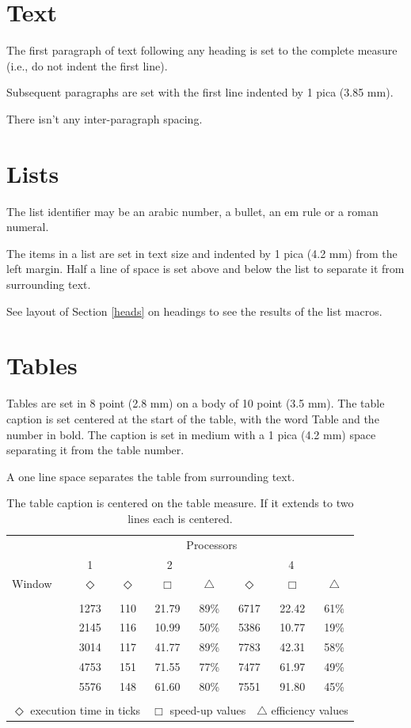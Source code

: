 \documentclass{ecai}
\begin{document}
\section{Text}
The first paragraph of text following any heading is set to the
complete measure (i.e., do not indent the first line).

Subsequent paragraphs are set with the first line indented
by 1 pica (3.85 mm).

There isn't any inter-paragraph spacing.

\section{Lists}
The list identifier may be an arabic number, a bullet, an em
rule or a roman numeral.

The items in a list are set in text size and indented by 1
pica (4.2 mm) from the left margin. Half a line of space is
set above and below the list to separate it from surrounding
text.

See layout of Section \ref{heads} on headings to see the results of the list macros.

\section{Tables}
Tables are set in 8 point (2.8 mm) on a body of 10 point (3.5 mm).
The table caption is set centered at the start of the table, with
the word Table and the number in bold. The caption is set in medium
with a 1 pica (4.2 mm) space separating it from the table number.

A one line space separates the table from surrounding text.

\begin{table}
\begin{center}
{\caption{The table caption is centered on the table measure. If it
extends to two lines each is centered.}\label{table1}}
\begin{tabular}{lccccccc}
\hline
\rule{0pt}{12pt}
&\multicolumn{7}{c}{Processors}\\
&1&\multicolumn{3}{c}{2}&\multicolumn{3}{c}{4}\\
\cline{2-8}
\rule{0pt}{12pt}
Window&$\Diamond$&$\Diamond$&$\Box$&$\bigtriangleup$&$\Diamond$&$\Box$&$\bigtriangleup$
\\
\hline
\\[-6pt]
\quad1&1273&110&21.79&89\%&6717&22.42&61\%\\
\quad2&2145&116&10.99&50\%&5386&10.77&19\%\\
\quad3&3014&117&41.77&89\%&7783&42.31&58\%\\
\quad4&4753&151&71.55&77\%&7477&61.97&49\%\\
\quad5&5576&148&61.60&80\%&7551&91.80&45\%
\\
\hline
\\[-6pt]
\multicolumn{8}{l}{$\Diamond$ execution time in ticks\ \
$\Box$ speed-up values\ \
$\bigtriangleup$ efficiency values}
\end{tabular}
\end{center}
\end{table}
\end{document}
